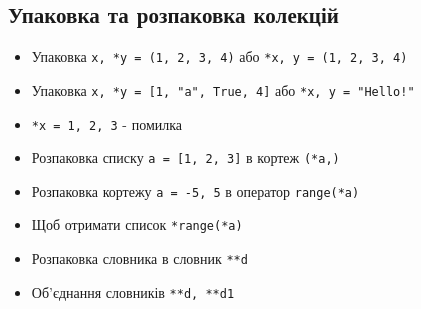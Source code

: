 \subsection{Упаковка та розпаковка колекцій} 
\begin{frame}
\begin{itemize}
  \item Упаковка \texttt{x, *y = (1, 2, 3, 4)} або \texttt{*x, y = (1, 2, 3, 4)}
  \item Упаковка \texttt{x, *y = [1, "a", True, 4]} або \texttt{*x, y = "Hello!"}
  \item \texttt{*x = 1, 2, 3} - помилка
  \item Розпаковка списку \texttt{a = [1, 2, 3]} в кортеж \texttt{(*a,)}
  \item Розпаковка кортежу \texttt{a = -5, 5} в оператор \texttt{range(*a)}
  \item Щоб отримати список \texttt{*range(*a)}
  \item Розпаковка словника в словник \texttt{**d}
  \item Об'єднання словників \texttt{**d, **d1} 
\end{itemize}

\end{frame}
